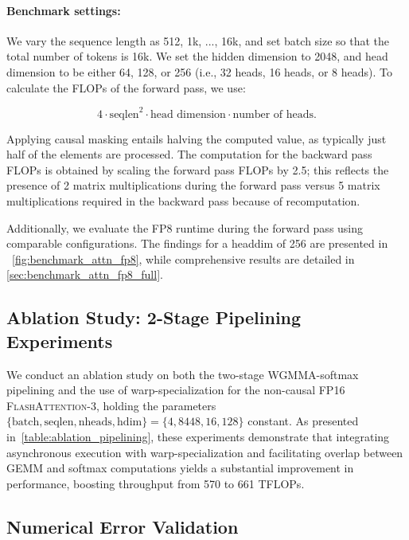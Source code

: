 \paragraph{Benchmark settings:} We vary the sequence length as 512, 1k, ..., 16k, and set batch size so that the total number of tokens is 16k. We set the hidden dimension to 2048, and head dimension to be either 64, 128, or 256 (i.e., 32 heads, 16 heads, or 8 heads). To calculate the FLOPs of the forward pass, we use:

\begin{equation*}
  4 \cdot \text{seqlen}^2 \cdot \text{head dimension} \cdot \text{number of heads}.
\end{equation*}

Applying causal masking entails halving the computed value, as typically just half of the elements are processed. The computation for the backward pass FLOPs is obtained by scaling the forward pass FLOPs by 2.5; this reflects the presence of 2 matrix multiplications during the forward pass versus 5 matrix multiplications required in the backward pass because of recomputation.

Additionally, we evaluate the FP8 runtime during the forward pass using comparable configurations. The findings for a headdim of 256 are presented in ~\cref{fig:benchmark_attn_fp8}, while comprehensive results are detailed in \cref{sec:benchmark_attn_fp8_full}.

\subsection{Ablation Study: 2-Stage Pipelining Experiments}
\label{sec:2-stage-pipelining-experiments}

We conduct an ablation study on both the two-stage WGMMA-softmax pipelining and the use of warp-specialization for the non-causal FP16 \textsc{FlashAttention-3}, holding the parameters $\{\text{batch}, \text{seqlen}, \text{nheads}, \text{hdim}\} = \{ 4, 8448, 16, 128\}$ constant.
As presented in~\cref{table:ablation_pipelining}, these experiments demonstrate that integrating asynchronous execution with warp-specialization and facilitating overlap between GEMM and softmax computations yields a substantial improvement in performance, boosting throughput from 570 to 661 TFLOPs.

\subsection{Numerical Error Validation}
\label{sec:numerical_error}

